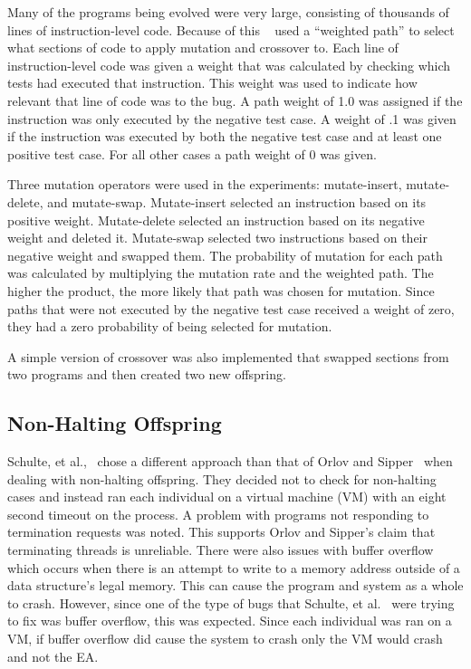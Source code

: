 \documentclass{sig-alternate}
\begin{document}
Many of the programs being evolved were very large, consisting of thousands of lines of instruction-level code. Because of this ~\cite{Assembly:2010} used a ``weighted path'' to select what sections of code to apply mutation and crossover to. Each line of instruction-level code was given a weight that was calculated by checking which tests had executed that instruction. This weight was used to indicate how relevant that line of code was to the bug. A path weight of 1.0 was assigned if the instruction was only executed by the negative test case. A weight of .1 was given if the instruction was executed by both the negative test case and at least one positive test case. For all other cases a path weight of 0 was given.

Three mutation operators were used in the experiments: mutate-insert, mutate-delete, and mutate-swap. Mutate-insert selected an instruction based on its positive weight. Mutate-delete selected an instruction based on its negative weight and deleted it. Mutate-swap selected two instructions based on their negative weight and swapped them. The probability of mutation for each path was calculated by multiplying the mutation rate and the weighted path. The higher the product, the more likely that path was chosen for mutation. Since paths that were not executed by the negative test case received a weight of zero, they had a zero probability of being selected for mutation.\par

A simple version of crossover was also implemented that swapped sections from two programs and then created two new offspring.

\subsection{Non-Halting Offspring}

Schulte, et al.,~\cite{Assembly:2010} chose a different approach than that of Orlov and Sipper~\cite{FINCH:2011} when dealing with non-halting offspring. They decided not to check for non-halting cases and instead ran each individual on a virtual machine (VM) with an eight second timeout on the process. A problem with programs not responding to termination requests was noted. This supports Orlov and Sipper's claim that terminating threads is unreliable. There were also issues with buffer overflow which occurs when there is an attempt to write to a memory address outside of a data structure's legal memory. This can cause the program and system as a whole to crash. However, since one of the type of bugs that Schulte, et al.~\cite{Assembly:2010} were trying to fix was buffer overflow, this was expected. Since each individual was ran on a VM, if buffer overflow did cause the system to crash only the VM would crash and not the EA.
\end{document}
